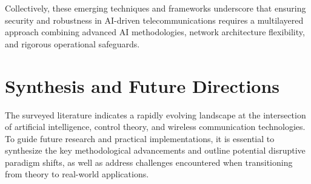 \documentclass[sigconf]{acmart}
\begin{document}
Collectively, these emerging techniques and frameworks underscore that ensuring security and robustness in AI-driven telecommunications requires a multilayered approach combining advanced AI methodologies, network architecture flexibility, and rigorous operational safeguards.

\section{Synthesis and Future Directions}

The surveyed literature indicates a rapidly evolving landscape at the intersection of artificial intelligence, control theory, and wireless communication technologies. To guide future research and practical implementations, it is essential to synthesize the key methodological advancements and outline potential disruptive paradigm shifts, as well as address challenges encountered when transitioning from theory to real-world applications.
\end{document}
